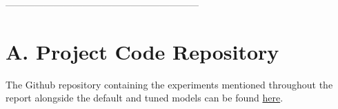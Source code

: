 \documentclass[10pt,twocolumn,letterpaper]{article}
\begin{document}







------------------------------------------------------------


\newpage

{\small


}


\section{A. Project Code Repository}
The Github repository containing the experiments mentioned throughout the report alongside the default and tuned models can be found \href{https://github.com/jadenzwicker/DL-Final-Project/tree/main}{here}. 
\end{document}
